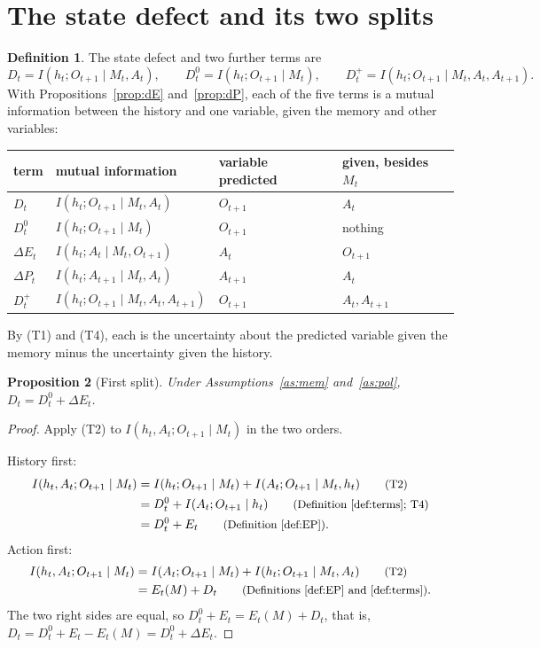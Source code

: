 \documentclass{article}
\newtheorem{proposition}{Proposition}[section]
\theoremstyle{definition}
\newtheorem{definition}[proposition]{Definition}
\theoremstyle{remark}
\newcommand{\dE}{\Delta E}
\newcommand{\dP}{\Delta P}
\newcommand{\why}[1]{\tag*{\small(#1)}}
\begin{document}
\section{The state defect and its two splits}\label{sec:splits}

\begin{definition}\label{def:terms}
The state defect and two further terms are
\[
D_t=I(h_t;O_{t+1}\mid M_t,A_t),\qquad D^0_t=I(h_t;O_{t+1}\mid M_t),\qquad D^+_t=I(h_t;O_{t+1}\mid M_t,A_t,A_{t+1}).
\]
With Propositions~\ref{prop:dE} and~\ref{prop:dP}, each of the five terms is a mutual information between the history and one variable, given the memory and other variables:
\begin{center}
\small
\begin{tabular}{llll}
\toprule
term & mutual information & variable predicted & given, besides $M_t$\\
\midrule
$D_t$ & $I(h_t;O_{t+1}\mid M_t,A_t)$ & $O_{t+1}$ & $A_t$\\
$D^0_t$ & $I(h_t;O_{t+1}\mid M_t)$ & $O_{t+1}$ & nothing\\
$\dE_t$ & $I(h_t;A_t\mid M_t,O_{t+1})$ & $A_t$ & $O_{t+1}$\\
$\dP_t$ & $I(h_t;A_{t+1}\mid M_t,A_t)$ & $A_{t+1}$ & $A_t$\\
$D^+_t$ & $I(h_t;O_{t+1}\mid M_t,A_t,A_{t+1})$ & $O_{t+1}$ & $A_t,A_{t+1}$\\
\bottomrule
\end{tabular}
\end{center}
By (T1) and (T4), each is the uncertainty about the predicted variable given the memory minus the uncertainty given the history.
\end{definition}

\begin{proposition}[First split]\label{prop:split1}
Under Assumptions~\ref{as:mem} and~\ref{as:pol}, $D_t=D^0_t+\dE_t$.
\end{proposition}

\begin{proof}
Apply (T2) to $I(h_t,A_t;O_{t+1}\mid M_t)$ in the two orders.

History first:
\begin{align*}
I(h_t,A_t;O_{t+1}\mid M_t)&=I(h_t;O_{t+1}\mid M_t)+I(A_t;O_{t+1}\mid M_t,h_t) \why{T2}\\
&=D^0_t+I(A_t;O_{t+1}\mid h_t) \why{Definition~\ref{def:terms}; T4}\\
&=D^0_t+E_t \why{Definition~\ref{def:EP}}.
\end{align*}
Action first:
\begin{align*}
I(h_t,A_t;O_{t+1}\mid M_t)&=I(A_t;O_{t+1}\mid M_t)+I(h_t;O_{t+1}\mid M_t,A_t) \why{T2}\\
&=E_t(M)+D_t \why{Definitions~\ref{def:EP} and~\ref{def:terms}}.
\end{align*}
The two right sides are equal, so $D^0_t+E_t=E_t(M)+D_t$, that is, $D_t=D^0_t+E_t-E_t(M)=D^0_t+\dE_t$.
\end{proof}
\end{document}
